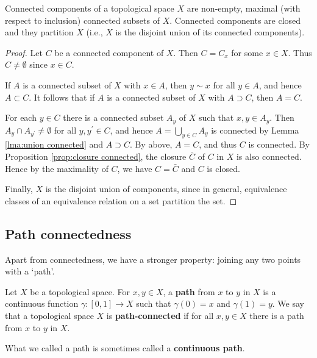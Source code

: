 \documentclass[a4paper]{article}
\begin{document}
\begin{proposition}\label{prop: connected components are maximal and partition}
    Connected components of a topological space $X$ are non-empty, maximal (with respect to inclusion) connected subsets of $X$. Connected components are closed and they partition $X$ (i.e., $X$ is the disjoint union of its connected components).
\end{proposition}
\begin{proof}
    Let $C$ be a connected component of $X$. Then $C=C_{x}$ for some $x \in X$. Thus $C \neq \emptyset$ since $x \in C$.

If $A$ is a connected subset of $X$ with $x \in A$, then $y \sim x$ for all $y \in A$, and hence $A \subset C$. It follows that if $A$ is a connected subset of $X$ with $A \supset C$, then $A=C$.

For each $y \in C$ there is a connected subset $A_{y}$ of $X$ such that $x, y \in A_{y}$. Then $A_{y} \cap A_{y^{\prime}} \neq \emptyset$ for all $y, y^{\prime} \in C$, and hence $A=\bigcup_{y \in C} A_{y}$ is connected by Lemma \ref{lma:union connected} and $A \supset C$. By above, $A=C$, and thus $C$ is connected. By Proposition \ref{prop:closure connected}, the closure $\bar{C}$ of $C$ in $X$ is also connected. Hence by the maximality of $C$, we have $C=\bar{C}$ and $C$ is closed. 

Finally, $X$ is the disjoint union of components, since in general, equivalence classes of an equivalence relation on a set partition the set.
\end{proof}

\subsection{Path connectedness}
Apart from connectedness, we have a stronger property: joining any two points with a `path'.
\begin{definition}
    Let $X$ be a topological space. For $x, y \in X$, a \textbf{path} from $x$ to $y$ in $X$ is a continuous function $\gamma:[0,1] \rightarrow X$ such that $\gamma(0)=x$ and $\gamma(1)=y$. We say that a topological space $X$ is \textbf{path-connected} if for all $x, y \in X$ there is a path from $x$ to $y$ in $X$.
\end{definition}

\begin{note}
    What we called a path is sometimes called a \textbf{continuous path}.
\end{note}
\end{document}
